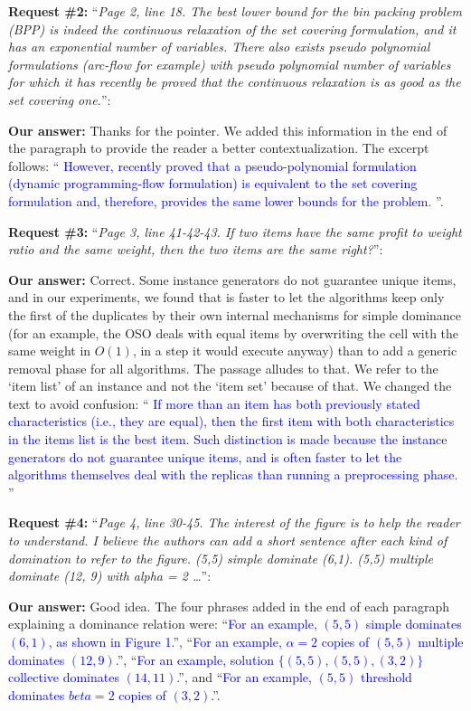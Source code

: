 \documentclass{elsarticle}
\begin{document}
\textbf{Request \#2:} ``\textit{Page 2, line 18. The best lower bound for the bin packing problem (BPP) is indeed the continuous relaxation of the set covering formulation, and it has an exponential number of variables. There also exists pseudo polynomial formulations (arc-flow for example) with pseudo polynomial number of variables for which it has recently be proved that the continuous relaxation is as good as the set covering one.}'':

\textbf{Our answer:} Thanks for the pointer. We added this information in the end of the paragraph to provide the reader a better contextualization. The excerpt follows: ``\textcolor{blue}{
However, recently \cite{eq_lb_delorme} proved that a pseudo-polynomial formulation (dynamic programming-flow formulation) is equivalent to the set covering formulation and, therefore, provides the same lower bounds for the problem.
}''.
\medskip

\textbf{Request \#3:} ``\textit{Page 3, line 41-42-43. If two items have the same profit to weight ratio and the same weight, then the two items are the same right?}'':

\textbf{Our answer:} Correct. Some instance generators do not guarantee unique items, and in our experiments, we found that is faster to let the algorithms keep only the first of the duplicates by their own internal mechanisms for simple dominance (for an example, the OSO deals with equal items by overwriting the cell with the same weight in \(O(1)\), in a step it would execute anyway) than to add a generic removal phase for all algorithms.
The passage alludes to that.
We refer to the `item list' of an instance and not the `item set' because of that.
We changed the text to avoid confusion: ``\textcolor{blue}{
If more than an item has both previously stated characteristics (i.e., they are equal), then the first item with both characteristics in the items list is the best item.
Such distinction is made because the instance generators do not guarantee unique items, and is often faster to let the algorithms themselves deal with the replicas than running a preprocessing phase.
}''
\medskip

\textbf{Request \#4:} ``\textit{Page 4, line 30-45. The interest of the figure is to help the reader to understand. I believe the authors can add a short sentence after each kind of domination to refer to the figure. (5,5) simple dominate (6,1). (5,5) multiple dominate (12, 9) with alpha = 2 \dots}'':

\textbf{Our answer:} Good idea. The four phrases added in the end of each paragraph explaining a dominance relation were: ``\textcolor{blue}{For an example, \((5, 5)\) simple dominates \((6, 1)\), as shown in Figure 1.}'', ``\textcolor{blue}{For an example, \(\alpha = 2\) copies of \((5, 5)\) multiple dominates \((12, 9)\).}'', ``\textcolor{blue}{For an example, solution \(\{(5, 5), (5, 5), (3, 2)\}\) collective dominates \((14, 11)\).}'', and ``\textcolor{blue}{For an example, \((5, 5)\) threshold dominates \(beta = 2\) copies of \((3, 2)\)}.''.
\medskip
\end{document}
